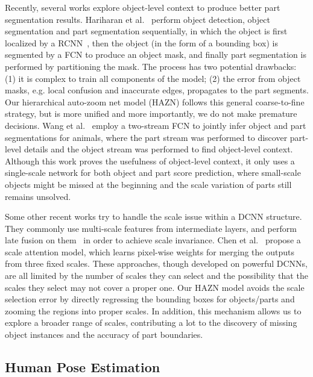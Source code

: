 Recently, several works explore object-level context to produce better part segmentation results.
Hariharan et al.~\cite{hariharan2015hypercolumns} perform object detection, object segmentation and part segmentation sequentially, in which the object is first localized by a RCNN~\cite{girshick2014rich}, then the object (in the form of a bounding box) is segmented by a FCN to produce an object mask, and finally part segmentation is performed by partitioning the mask. The process has two potential drawbacks: (1) it is complex to train all components of the model; (2) the error from object masks, e.g. local confusion and inaccurate edges, propagates to the part segments.
Our hierarchical auto-zoom net model (HAZN) follows this general coarse-to-fine strategy, but is more unified and more importantly, we do not make premature decisions.
Wang et al.~\cite{wang2015joint} employ a two-stream FCN to jointly infer object and part segmentations for animals, where the part stream was performed to discover part-level details and the object stream was performed to find object-level context.
Although this work proves the usefulness of object-level context, it only uses a single-scale network for both object and part score prediction, where small-scale objects might be missed at the beginning and the scale variation of parts still remains unsolved.

Some other recent works try to handle the scale issue within a DCNN structure.
They commonly use multi-scale features from intermediate layers, and perform late fusion on them~\cite{long2015fully,hariharan2015hypercolumns,chen2016deeplab} in order to achieve scale invariance. Chen et al.~\cite{chen2016attention} propose a scale attention model, which learns pixel-wise weights for merging the outputs from three fixed scales.
These approaches, though developed on powerful DCNNs, are all limited by the number of scales they can select and the possibility that the scales they select may not cover a proper one. Our HAZN model avoids the scale selection error by directly regressing the bounding boxes for objects/parts and zooming the regions into proper scales.
In addition, this mechanism allows us to explore a broader range of scales, contributing a lot to the discovery of missing object instances and the accuracy of part boundaries.

\subsection{Human Pose Estimation}

